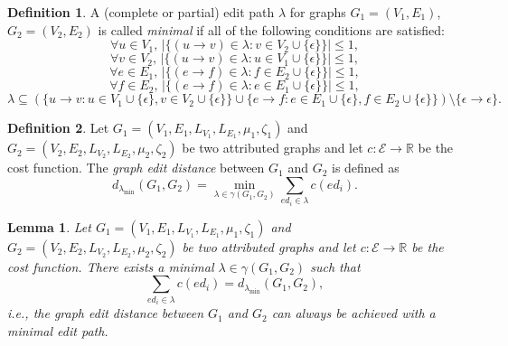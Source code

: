 \documentclass{article}
\newtheorem{lemma}{Lemma}
\theoremstyle{definition}
\newtheorem{definition}{Definition}
\begin{document}
\begin{definition}
  \label{def:minimal}
  A (complete or partial) edit path $\lambda$ for graphs $G_1 = (V_1, E_1)$, $G_2 = (V_2, E_2)$ is called \emph{minimal} if all of the following conditions are satisfied:
  \begin{equation}
  \forall u \in V_1\text{, }|\{ (u \to v) \in \lambda: v \in V_2 \cup \{ \epsilon \} \}| \le 1, \tag{M1} \label{eq:minimal1}
  \end{equation}
  \begin{equation}
  \forall v \in V_2\text{, }|\{ (u \to v) \in \lambda: u \in V_1 \cup \{ \epsilon \} \}| \le 1, \tag{M2} \label{eq:minimal2}
  \end{equation}
  \begin{equation}
  \forall e \in E_1\text{, }|\{ (e \to f) \in \lambda: f \in E_2 \cup \{ \epsilon \} \}| \le 1, \tag{M3} \label{eq:minimal3}
  \end{equation}
  \begin{equation}
  \forall f \in E_2\text{, }|\{ (e \to f) \in \lambda: e \in E_1 \cup \{ \epsilon \} \}| \le 1, \tag{M4} \label{eq:minimal4}
  \end{equation}
  \begin{equation} \tag{M5} \label{eq:minimal5}
  \lambda \subseteq (\{ u \to v: u \in V_1 \cup \{ \epsilon \}, v \in V_2 \cup \{ \epsilon \} \} \cup \{ e \to f: e \in E_1 \cup \{ \epsilon \}, f \in E_2 \cup \{ \epsilon \} \}) \setminus \{ \epsilon \to \epsilon \}.
  \end{equation}
\end{definition}
\begin{definition}
  Let $G_1 = (V_1, E_1, L_{V_1}, L_{E_1}, \mu_1, \zeta_1)$ and $G_2 = (V_2, E_2, L_{V_2}, L_{E_2}, \mu_2, \zeta_2)$ be two attributed graphs and let $c: \mathcal{E} \to \mathbb{R}$ be the cost function. The \emph{graph edit distance} between $G_1$ and $G_2$ is defined as
  \[ d_{\lambda_{\text{min}}}(G_1, G_2) = \min_{\lambda \in \gamma(G_1, G_2)} \sum_{ed_i \in \lambda} c(ed_i).\]
\end{definition}
\begin{lemma}
  \label{lem:minimal}
  Let $G_1 = (V_1, E_1, L_{V_1}, L_{E_1}, \mu_1, \zeta_1)$ and $G_2 = (V_2, E_2, L_{V_2}, L_{E_2}, \mu_2, \zeta_2)$ be two attributed graphs and let $c: \mathcal{E} \to \mathbb{R}$ be the cost function. There exists a minimal $\lambda \in \gamma(G_1, G_2)$ such that
  \begin{equation}
    \label{eq:distance}
    \tag{$\dagger$}
    \sum_{ed_i \in \lambda} c(ed_i) = d_{\lambda_{\text{min}}}(G_1, G_2),
  \end{equation}
  i.e., the graph edit distance between $G_1$ and $G_2$ can always be achieved with a minimal edit path.
\end{lemma}
\end{document}
